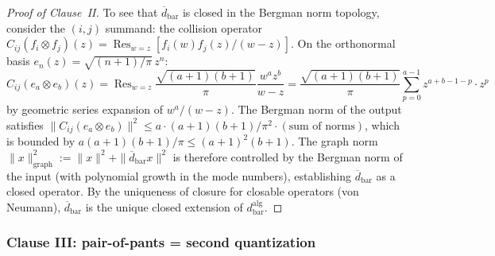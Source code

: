 \begin{proof}[Proof of Clause~II]
To see that $\overline{d}_{\mathrm{bar}}$ is closed in
the Bergman norm topology, consider the $(i,j)$ summand:
the collision operator $C_{ij}(f_i \otimes f_j)(z)
= \operatorname{Res}_{w=z}[f_i(w)f_j(z)/(w-z)]$.
On the orthonormal basis $e_n(z) = \sqrt{(n+1)/\pi}\,z^n$:
\[
C_{ij}(e_a \otimes e_b)(z)
= \operatorname{Res}_{w=z}\!
\frac{\sqrt{(a+1)(b+1)}}{\pi}
\frac{w^a z^b}{w - z}
= \frac{\sqrt{(a+1)(b+1)}}{\pi}
\sum_{p=0}^{a-1} z^{a+b-1-p}\cdot z^p
\]
by geometric series expansion of $w^a/(w-z)$. The
Bergman norm of the output satisfies
$\|C_{ij}(e_a \otimes e_b)\|^2
\leq a \cdot (a+1)(b+1)/\pi^2 \cdot (\text{sum of norms})$,
which is bounded by $a(a+1)(b+1)/\pi \leq (a+1)^2(b+1)$.
The graph norm
$\|x\|_{\mathrm{graph}}^2
:= \|x\|^2 + \|\overline{d}_{\mathrm{bar}} x\|^2$
is therefore controlled by the Bergman norm of the input
(with polynomial growth in the mode numbers), establishing
$\overline{d}_{\mathrm{bar}}$ as a closed operator. By
the uniqueness of closure for closable operators (von Neumann),
$\overline{d}_{\mathrm{bar}}$ is the unique closed extension
of $d_{\mathrm{bar}}^{\mathrm{alg}}$.
\end{proof}

\subsubsection{Clause III: pair-of-pants = second quantization}

